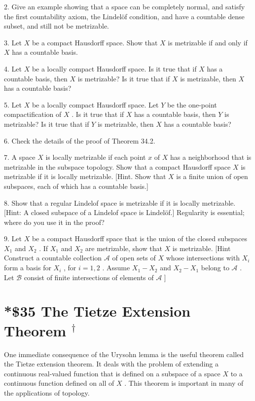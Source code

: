 2. Give an example showing that a space can be completely normal, and satisfy the first countability axiom, the Lindelöf condition, and have a countable dense subset, and still not be metrizable.

3. Let \(X\) be a compact Hausdorff space. Show that \(X\) is metrizable if and only if \(X\) has a countable basis.

4. Let \(X\) be a locally compact Hausdorff space. Is it true that if \(X\) has a countable basis, then \(X\) is metrizable? Is it true that if \(X\) is metrizable, then \(X\) has a countable basis?

5. Let \(X\) be a locally compact Hausdorff space. Let \(Y\) be the one-point compactification of \(X\) . Is it true that if \(X\) has a countable basis, then \(Y\) is metrizable? Is it true that if \(Y\) is metrizable, then \(X\) has a countable basis?

6. Check the details of the proof of Theorem 34.2.

7. A space \(X\) is locally metrizable if each point \(x\) of \(X\) has a neighborhood that is metrizable in the subspace topology. Show that a compact Hausdorff space \(X\) is metrizable if it is locally metrizable. [Hint. Show that \(X\) is a finite union of open subspaces, each of which has a countable basis.]

8. Show that a regular Lindelof space is metrizable if it is locally metrizable. [Hint: A closed subspace of a Lindelof space is Lindelöf.] Regularity is essential; where do you use it in the proof?

9. Let \(X\) be a compact Hausdorff space that is the union of the closed subspaces \({X}_{1}\) and \({X}_{2}\) . If \({X}_{1}\) and \({X}_{2}\) are metrizable, show that \(X\) is metrizable. [Hint Construct a countable collection \(\mathcal{A}\) of open sets of \(X\) whose intersections with \({X}_{i}\) form a basis for \({X}_{i}\) , for \(i = 1,2\) . Assume \({X}_{1} - {X}_{2}\) and \({X}_{2} - {X}_{1}\) belong to \(\mathcal{A}\) . Let \(\mathcal{B}\) consist of finite intersections of elements of \(\mathcal{A}\) ]

\section*{*\$35 The Tietze Extension Theorem \({}^{ \dagger  }\)}

One immediate consequence of the Urysohn lemma is the useful theorem called the Tietze extension theorem. It deals with the problem of extending a continuous real-valued function that is defined on a subspace of a space \(X\) to a continuous function defined on all of \(X\) . This theorem is important in many of the applications of topology.


